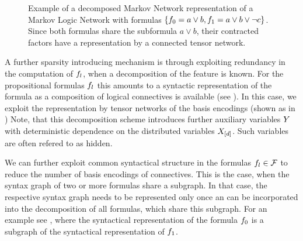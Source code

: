 \begin{figure}[t]
\begin{center}
	
\end{center}
\caption{Example of a decomposed Markov Network representation of a Markov Logic Network with formulas $\{f_{0} = a\lor b, f_{1} = a \lor b \lor \lnot c\}$.
	Since both formulas share the subformula $a\lor b$, their contracted factors have a representation by a connected tensor network.}
\label{fig:mlnDecRep}
\end{figure}


A further sparsity introducing mechanism is through exploiting redundancy in the computation of $f_{l}$, when a decomposition of the feature is known.
For the propositional formulas $f_{l}$ this amounts to a syntactic representation of the formula as a composition of logical connectives is available (see ). %
In this case, we exploit the representation by tensor networks of the basis encodings (shown as  in )
Note, that this decomposition scheme introduces further auxiliary variables $Y$ with deterministic dependence on the distributed variables $X_{[d]}$.
Such variables are often refered to as hidden.

We can further exploit common syntactical structure in the formulas $f_{l}\in\mathcal{F}$ to reduce the number of basis encodings of connectives.
This is the case, when the syntax graph of two or more formulas share a subgraph.
In that case, the respective syntax graph needs to be represented only once an can be incorporated into the decomposition of all formulas, which share this subgraph.
For an example see , where the syntactical representation of the formula $f_{0}$ is a subgraph of the syntactical representation of $f_{1}$.



